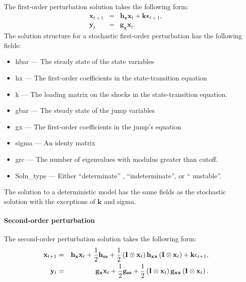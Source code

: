 \documentclass[notitlepage,11pt]{article}
\begin{document}
The first-order perturbation solution takes the following form:%
\begin{eqnarray*}
\mathbf{x}_{t+1} &=&\mathbf{h}_{\mathbf{x}}\mathbf{x}_{t}+\mathbf{k\epsilon }%
_{t+1}, \\
\mathbf{y}_{t} &=&\mathbf{g}_{\mathbf{x}}\mathbf{x}_{t}.
\end{eqnarray*}%
The solution structure for a stochastic first-order perturbation has the
following fields:

\begin{itemize}
\item hbar --- The steady state of the state variables

\item hx --- The first-order coefficients in the state-transition equation

\item k --- The loading matrix on the shocks in the state-transition
equation.

\item gbar --- The steady state of the jump variables

\item gx --- The first-order coefficients in the jump's equation

\item sigma --- An identy matrix

\item grc --- The number of eigenvalues with modulus greater than cutoff.

\item Soln\_type --- Either \textquotedblleft determinate\textquotedblright
, \textquotedblleft indeterminate\textquotedblright , or \textquotedblleft
unstable\textquotedblright .
\end{itemize}

The solution to a deterministic model has the same fields as the stochastic
solution with the exceptions of $\mathbf{k}$ and sigma.

\paragraph{Second-order perturbation}

The second-order perturbation solution takes the following form:%
\begin{eqnarray*}
\mathbf{x}_{t+1} &=&\mathbf{h}_{\mathbf{x}}\mathbf{x}_{t}+\frac{1}{2}\mathbf{%
h}_{\mathbf{ss}}+\frac{1}{2}\left( \mathbf{I}\otimes \mathbf{x}_{t}\right) 
\mathbf{h}_{\mathbf{xx}}\left( \mathbf{I}\otimes \mathbf{x}_{t}\right) +%
\mathbf{k\epsilon }_{t+1}, \\
\mathbf{y}_{t} &=&\mathbf{g}_{\mathbf{x}}\mathbf{x}_{t}+\frac{1}{2}\mathbf{g}%
_{\mathbf{ss}}+\frac{1}{2}\left( \mathbf{I}\otimes \mathbf{x}_{t}\right) 
\mathbf{g}_{\mathbf{xx}}\left( \mathbf{I}\otimes \mathbf{x}_{t}\right) .
\end{eqnarray*}
\end{document}
